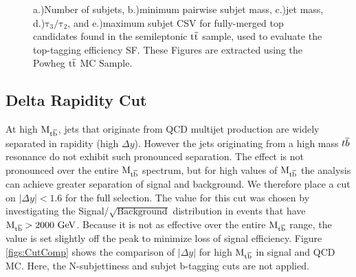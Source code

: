 \begin{figure}
\begin{center}
\end{center}
\caption{ a.)Number of subjets, b.)minimum pairwise subjet mass, c.)jet mass, d.)$\mathrm{\tau_{3}/\tau_{2}}$, and  e.)maximum subjet CSV for fully-merged top candidates
  found in the semileptonic $\mathrm{t\overline{t}}$ sample, used to evaluate the top-tagging efficiency SF.  These Figures are extracted using the Powheg $\mathrm{t\overline{t}}$ MC Sample. }%
\label{figs:type1_topmasspowheg}
\end{figure}

\subsection{Delta Rapidity Cut}
\label{sec:deltarapidity}
At high $\mathrm{M_{{t\overline{b}}}}$, jets that originate from QCD multijet production are widely separated in rapidity (high $\Delta y$).
However the jets originating from a high mass ${t\overline{b}}$ resonance do not exhibit such pronounced separation.  The effect is not pronounced over the entire 
$\mathrm{M_{{t\overline{b}}}}$ spectrum, but for high values of $\mathrm{M_{{t\overline{b}}}}$ the analysis can achieve greater separation of signal and background.  We therefore place a cut on $|\Delta y| < 1.6$ 
for the full selection.  The value for this cut was chosen by investigating the Signal/$\sqrt{\text{Background}}$ distribution in events that have $\mathrm{M_{{t\overline{b}}}}>2000~\mathrm{GeV}$.  
Because it is not as effective over the entire $\mathrm{M_{{t\overline{b}}}}$ range, the value is set slightly off the peak to minimize loss of signal efficiency.
Figure \ref{figs:CutComp} shows the comparison of $|\Delta y|$ for high $\mathrm{M_{{t\overline{b}}}}$ in signal and QCD MC.  
Here, the N-subjettiness and subjet b-tagging cuts are not applied.

